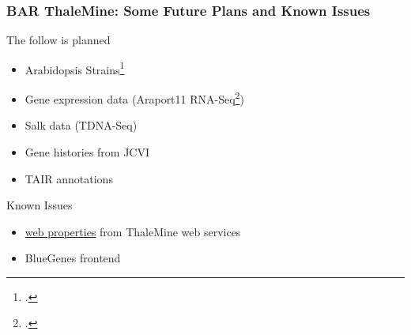 \documentclass{beamer}
\begin{document}
\begin{frame}
    \frametitle{BAR ThaleMine: Some Future Plans and Known Issues}
    The follow is planned
    \begin{itemize}
        \item Arabidopsis Strains\footcite{strains2019}
        \item Gene expression data (Araport11 RNA-Seq\footcite{cheng2017})
        \item Salk data (TDNA-Seq)
        \item Gene histories from JCVI
        \item TAIR annotations 
    \end{itemize}
    Known Issues
    \begin{itemize}
        \item \href{https://bar.utoronto.ca/thalemine/service/web-properties}{web properties} from ThaleMine web services
        \item BlueGenes frontend
    \end{itemize}
\end{frame}
\end{document}
